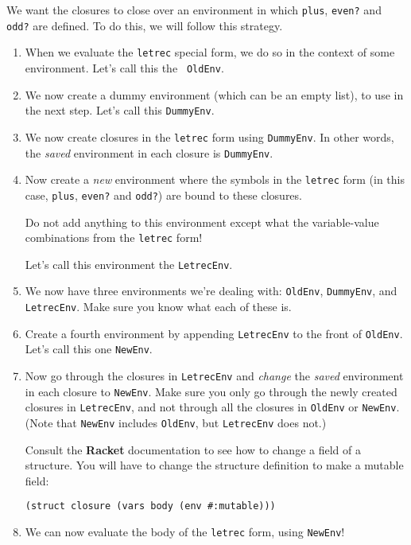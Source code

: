 \documentclass{article}
\begin{document}
We want the closures to close over an environment in which {\tt plus},
{\tt even?} and {\tt odd?} are defined.  To do this, we will follow
this strategy.
\begin{enumerate}
  \item When we evaluate the {\tt letrec} special form, we do so in
    the context of some environment.  Let's call this the {\tt
      OldEnv}.
  \item We now create a dummy environment (which can be an empty
    list), to use in the next step.  Let's call this {\tt DummyEnv}.
  \item We now create closures in the {\tt letrec} form
    using {\tt DummyEnv}.  In other words,
    the {\em saved} environment in each closure is {\tt DummyEnv}.
  \item Now create a {\em new} environment where the symbols
    in the {\tt letrec} form (in this case,
    {\tt plus}, {\tt even?} and {\tt odd?}) are bound to these closures.

    Do not add anything to this environment except what the
    variable-value combinations from the {\tt letrec} form!

    Let's call this environment the {\tt LetrecEnv}.

  \item We now have three environments we're dealing with:
    {\tt OldEnv}, {\tt DummyEnv}, and {\tt LetrecEnv}.  Make sure you
    know what each of these is.

  \item Create a fourth environment by appending {\tt LetrecEnv} to
    the front of {\tt OldEnv}.  Let's call this one {\tt NewEnv}.

\item Now go through the closures  in {\tt LetrecEnv}
  and {\em change} the {\em saved} environment in each closure
  to {\tt NewEnv}.  Make sure you only go through the newly created
  closures in {\tt LetrecEnv}, and not through all the closures 
  in {\tt OldEnv} or {\tt NewEnv}.  (Note that {\tt NewEnv} includes
  {\tt OldEnv}, but {\tt LetrecEnv} does not.)

Consult the {\bf Racket} documentation to see how to
change a field of a structure.  You will have to change the
structure definition to make a mutable field:
\begin{Verbatim}[frame=single]
  (struct closure (vars body (env #:mutable)))
\end{Verbatim}

\item We can now evaluate the body of the {\tt letrec} form, using
  {\tt NewEnv}!
  
\end{enumerate}
\end{document}
